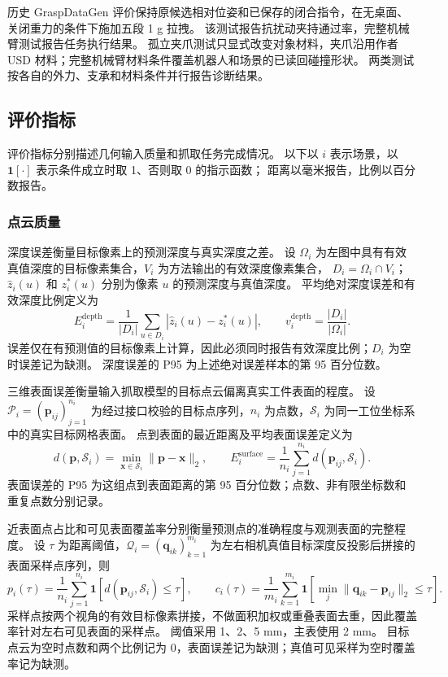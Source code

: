 \documentclass[UTF8,fontset=fandol,a4paper,11pt]{ctexart}
\newcommand{\qyb}[1]{#1}
\begin{document}
历史 GraspDataGen 评价保持原候选相对位姿和已保存的闭合指令，在无桌面、关闭重力的条件下施加五段 1 g 拉拽。
该测试报告抗扰动夹持通过率，完整机械臂测试报告任务执行结果。
孤立夹爪测试只显式改变对象材料，夹爪沿用作者 USD 材料；完整机械臂材料条件覆盖机器人和场景的已读回碰撞形状。
两类测试按各自的外力、支承和材料条件并行报告诊断结果。

\subsection{\qyb{评价指标}}

评价指标分别描述几何输入质量和抓取任务完成情况。
以下以 $i$ 表示场景，以 $\mathbf{1}[\cdot]$ 表示条件成立时取 1、否则取 0 的指示函数；
距离以毫米报告，比例以百分数报告。

\subsubsection{点云质量}

深度误差衡量目标像素上的预测深度与真实深度之差。
设 $\Omega_i$ 为左图中具有有效真值深度的目标像素集合，$V_i$ 为方法输出的有效深度像素集合，
$D_i=\Omega_i\cap V_i$；$\hat z_i(u)$ 和 $z_i^*(u)$ 分别为像素 $u$ 的预测深度与真值深度。
平均绝对深度误差和有效深度比例定义为
\[
 E_i^{\mathrm{depth}}=\frac{1}{|D_i|}\sum_{u\in D_i}|\hat z_i(u)-z_i^*(u)|,
 \qquad
 v_i^{\mathrm{depth}}=\frac{|D_i|}{|\Omega_i|}.
\]
误差仅在有预测值的目标像素上计算，因此必须同时报告有效深度比例；$D_i$ 为空时误差记为缺测。
深度误差的 P95 为上述绝对误差样本的第 95 百分位数。

三维表面误差衡量输入抓取模型的目标点云偏离真实工件表面的程度。
设 $\mathcal P_i=(\mathbf p_{ij})_{j=1}^{n_i}$ 为经过接口校验的目标点序列，$n_i$ 为点数，$\mathcal S_i$ 为同一工位坐标系中的真实目标网格表面。
点到表面的最近距离及平均表面误差定义为
\[
 d(\mathbf p,\mathcal S_i)=\min_{\mathbf x\in\mathcal S_i}\|\mathbf p-\mathbf x\|_2,
 \qquad
 E_i^{\mathrm{surface}}=\frac{1}{n_i}\sum_{j=1}^{n_i}d(\mathbf p_{ij},\mathcal S_i).
\]
表面误差的 P95 为这组点到表面距离的第 95 百分位数；点数、非有限坐标数和重复点数分别记录。

近表面点占比和可见表面覆盖率分别衡量预测点的准确程度与观测表面的完整程度。
设 $\tau$ 为距离阈值，$\mathcal Q_i=(\mathbf q_{ik})_{k=1}^{m_i}$ 为左右相机真值目标深度反投影后拼接的表面采样点序列，则
\[
 p_i(\tau)=\frac{1}{n_i}\sum_{j=1}^{n_i}\mathbf{1}\!\left[d(\mathbf p_{ij},\mathcal S_i)\leq\tau\right],
 \qquad
 c_i(\tau)=\frac{1}{m_i}\sum_{k=1}^{m_i}\mathbf{1}\!\left[\min_j\|\mathbf q_{ik}-\mathbf p_{ij}\|_2\leq\tau\right].
\]
采样点按两个视角的有效目标像素拼接，不做面积加权或重叠表面去重，因此覆盖率针对左右可见表面的采样点。
阈值采用 1、2、5 mm，主表使用 2 mm。
目标点云为空时点数和两个比例记为 0，表面误差记为缺测；真值可见采样为空时覆盖率记为缺测。
\end{document}
